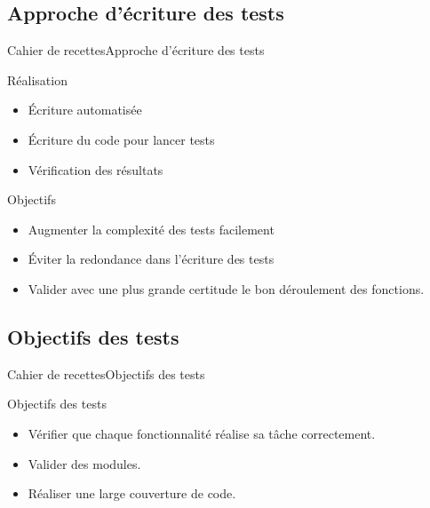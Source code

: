     \subsection{Approche d'écriture des tests}
      \begin{frame}{Cahier de recettes}{Approche d'écriture des tests}
        \begin{block}{Réalisation}
          \begin{itemize}
            \item<1-> Écriture automatisée
            \item<2-> Écriture du code pour lancer tests
            \item<3-> Vérification des résultats
          \end{itemize}
        \end{block}
        \begin{block}{Objectifs}
          \begin{itemize}
            \item<4-> Augmenter la complexité des tests facilement
            \item<5-> Éviter la redondance dans l'écriture des tests
            \item<6-> Valider avec une plus grande certitude le bon déroulement des fonctions.
          \end{itemize}
        \end{block}
      \end{frame}

      \subsection{Objectifs des tests}
      \begin{frame}{Cahier de recettes}{Objectifs des tests}
        \begin{block}{Objectifs des tests}
          \begin{itemize}
            \item<1-> Vérifier que chaque fonctionnalité réalise sa tâche correctement.
            \item<2-> Valider des modules.
            \item<3-> Réaliser une large couverture de code.
          \end{itemize}
        \end{block}
      \end{frame}  

